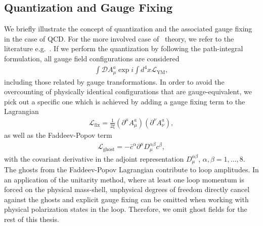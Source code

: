 \subsection{Quantization and Gauge Fixing}
\label{sec:quant-gauge-fixing}
We briefly illustrate the concept of quantization and the associated
gauge fixing in the case of QCD. For the more involved case of
\ew~theory, we refer to the literature e.g.\ \cite{Bohm:2001yx}. If we
perform the quantization by following the path-integral formulation,
all gauge field configurations are considered
\begin{align}
  \int \mathcal{D}A_\mu^a\exp{i\int d^4x \mathcal{L}_{\text{YM}}},
\end{align}
including those related by gauge transformations. In order to avoid
the overcounting of physically identical configurations that are
gauge-equivalent, we pick out a specific one which is achieved by
adding a gauge fixing term to the Lagrangian
\begin{align}
  \mathcal{L}_{\text{fix}} = \frac{1}{2\xi}(\partial^\mu A_\mu^a)(\partial^\nu A_\nu^a),
\end{align}
as well as the Faddeev-Popov term
\begin{align}
  \mathcal{L}_{\text{ghost}} = -\bar{c}^\alpha\partial^\mu D_\mu^{\alpha\beta}c^{\beta},
\end{align}
with the covariant derivative in the adjoint representation
$D_\mu^{\alpha\beta}$, $\alpha,\beta=1,\ldots,8$. The ghosts from the
Faddeev-Popov Lagrangian contribute to loop amplitudes. In an
application of the unitarity method, where at least one loop momentum
is forced on the physical mass-shell, unphysical degrees of freedom directly cancel against the ghosts and explicit gauge fixing can be omitted when working with physical polarization states in the loop. Therefore, we omit ghost fields for the rest of this thesis.

